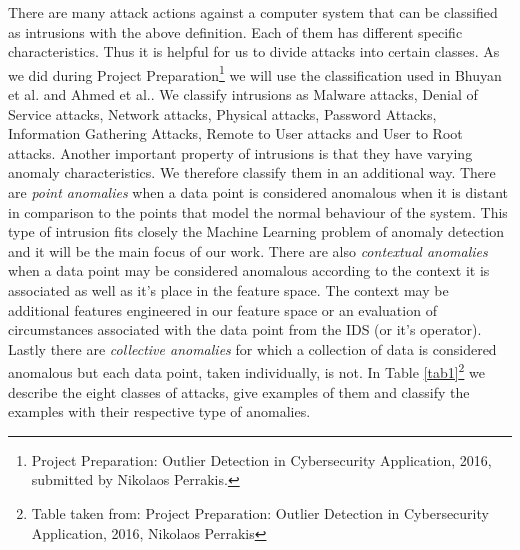 \documentclass[reqno,openany,12pt]{amsbook}
\begin{document}
There are many attack actions against a computer system that can be classified as intrusions with the above definition. Each of them has different specific characteristics. Thus it is helpful for us to divide attacks into certain classes. As we did during Project Preparation\footnote{Project Preparation: Outlier Detection in Cybersecurity Application, 2016, submitted by Nikolaos Perrakis.} we will use the classification used in Bhuyan et al.\cite{ids1} and Ahmed et al.\cite{ids2}. We classify intrusions as Malware attacks, Denial of Service attacks, Network attacks, Physical attacks, Password Attacks, Information Gathering Attacks, Remote to User attacks and User to Root attacks.
Another important property of intrusions is that they have varying anomaly characteristics. We therefore classify them in an additional way. There are \emph{point anomalies} when a data point is considered anomalous when it is distant in comparison to the points that model the normal behaviour of the system. This type of intrusion fits closely the Machine Learning problem of anomaly detection and it will be the main focus of our work. There are also \emph{contextual anomalies} when a data point may be considered anomalous according to the context it is associated as well as it's place in the feature space. The context may be additional features engineered in our feature space or an evaluation of circumstances associated with the data point from the IDS (or it's operator). Lastly there are \emph{collective anomalies} for which a collection of data is considered anomalous but each data point, taken individually, is not. In Table \ref{tab1}\footnote{Table taken from: Project Preparation: Outlier Detection in Cybersecurity Application, 2016, Nikolaos Perrakis} we describe the eight classes of attacks, give examples of them and classify the examples with their respective type of anomalies.
\end{document}
